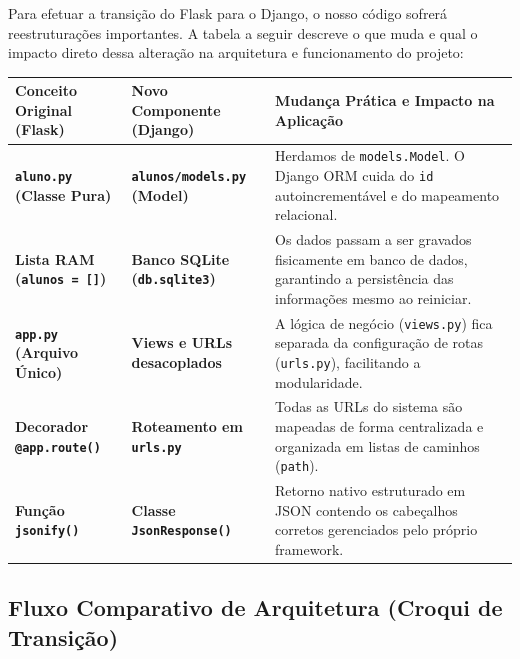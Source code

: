 \documentclass[12pt,a4paper]{article}
\begin{document}
Para efetuar a transição do Flask para o Django, o nosso código sofrerá reestruturações importantes. A tabela a seguir descreve o que muda e qual o impacto direto dessa alteração na arquitetura e funcionamento do projeto:

\vspace{0.3cm}
\begin{center}
\small
\renewcommand{\arraystretch}{1.4}
\begin{tabularx}{\linewidth}{|p{3.5cm}|p{3.5cm}|X|}
\hline
\rowcolor{azulTitulo}
\color{white}\textbf{Conceito Original (Flask)} & 
\color{white}\textbf{Novo Componente (Django)} & 
\color{white}\textbf{Mudança Prática e Impacto na Aplicação} \\ \hline

\textbf{\texttt{aluno.py} (Classe Pura)} & 
\textbf{\texttt{alunos/models.py} (Model)} & 
Herdamos de \texttt{models.Model}. O Django ORM cuida do \texttt{id} autoincrementável e do mapeamento relacional. \\ \hline

\textbf{Lista RAM (\texttt{alunos = []})} & 
\textbf{Banco SQLite (\texttt{db.sqlite3})} & 
Os dados passam a ser gravados fisicamente em banco de dados, garantindo a persistência das informações mesmo ao reiniciar. \\ \hline

\textbf{\texttt{app.py} (Arquivo Único)} & 
\textbf{Views e URLs desacoplados} & 
A lógica de negócio (\texttt{views.py}) fica separada da configuração de rotas (\texttt{urls.py}), facilitando a modularidade. \\ \hline

\textbf{Decorador \texttt{@app.route()}} & 
\textbf{Roteamento em \texttt{urls.py}} & 
Todas as URLs do sistema são mapeadas de forma centralizada e organizada em listas de caminhos (\texttt{path}). \\ \hline

\textbf{Função \texttt{jsonify()}} & 
\textbf{Classe \texttt{JsonResponse()}} & 
Retorno nativo estruturado em JSON contendo os cabeçalhos corretos gerenciados pelo próprio framework. \\ \hline
\end{tabularx}
\end{center}

\newpage

\subsection{Fluxo Comparativo de Arquitetura (Croqui de Transição)}
\end{document}
